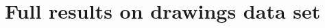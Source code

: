 \documentclass{article}
\newcommand{\probability}{\mathds{P}} %
\begin{document}




\section{Full results on drawings data set}
\end{document}
